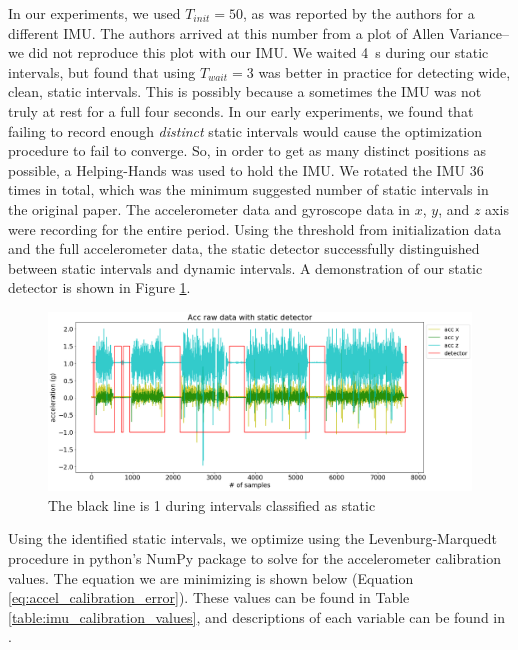 \documentclass{article}
\begin{document}
    In our experiments, we used $T_{init}=50$, as was reported by the authors for a different IMU. The authors arrived at this number from a plot of Allen Variance--we did not reproduce this plot with our IMU. We waited \SI{4}{\second} during our static intervals, but found that using $T_{wait}=3$ was better in practice for detecting wide, clean, static intervals. This is possibly because a sometimes the IMU was not truly at rest for a full four seconds. In our early experiments, we found that failing to record enough \textit{distinct} static intervals would cause the optimization procedure to fail to converge. So, in order to get as many distinct positions as possible, a Helping-Hands was used to hold the IMU. We rotated the IMU 36 times in total, which was the minimum suggested number of static intervals in the original paper. The accelerometer data and gyroscope data in $x$, $y$, and $z$ axis were recording for the entire period. Using the threshold from initialization data and the full accelerometer data, the static detector successfully distinguished between static intervals and dynamic intervals. A demonstration of our static detector is shown in Figure \ref{fig:static_detector}.

    \begin{figure}[H]
      \centering
      \includegraphics[width=1\linewidth]{./images/static_detector.png}
      \caption{The black line is 1 during intervals classified as static}
      \label{fig:static_detector}
    \end{figure}

    Using the identified static intervals, we optimize using the Levenburg-Marquedt procedure in python's NumPy package to solve for the accelerometer calibration values. The equation we are minimizing is shown below (Equation \ref{eq:accel_calibration_error}). These values can be found in Table \ref{table:imu_calibration_values}, and descriptions of each variable can be found in \cite{tedaldi_robust_2014}.
\end{document}
